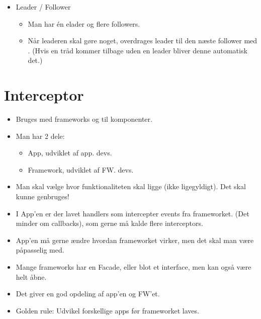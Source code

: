 \documentclass[oneside, 10pt]{memoir}
\begin{document}
\begin{itemize}
	\item Leader / Follower
	\begin{itemize}
		\item Man har én elader og flere followers.
		\item Når leaderen skal gøre noget, overdrages leader til den næste follower med . (Hvis en tråd kommer tilbage uden en leader bliver denne automatisk det.)
	\end{itemize}

\end{itemize}



\newpage
\section*{Interceptor}

\begin{itemize}
	\item Bruges med frameworks og til komponenter.
	
	\item Man har 2 dele:
	\begin{itemize}
		\item App, udviklet af app. devs.
		\item Framework, udviklet af FW. devs.
	\end{itemize}

	\item Man skal vælge hvor funktionaliteten skal ligge (ikke ligegyldigt).
	\subitem Det skal kunne genbruges!
	
	\item I App'en er der lavet handlers som intercepter events fra frameworket. (Det minder om callbacks), som gerne må kalde flere interceptors.
	
	\item App'en må gerne ændre hvordan frameworket virker, men det skal man være påpasselig med.

	\item Mange frameworks har en Facade, eller blot et interface, men kan også være helt åbne.

	\item Det giver en god opdeling af app'en og FW'et.

	\item Golden rule: Udvikel forskellige apps før frameworket laves.
\end{itemize}
\end{document}
